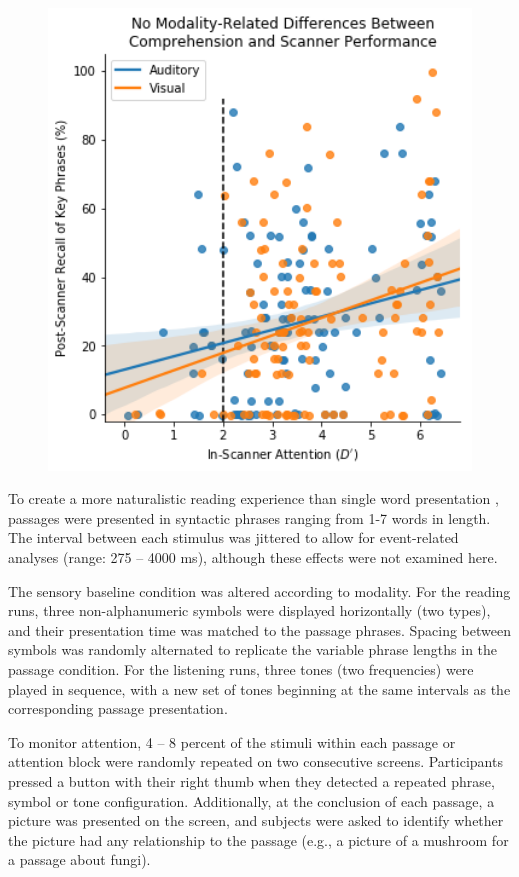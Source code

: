 \begin{figure}[tp]
	\centering
	\includegraphics[width=5in]{images/ch2-eprime-recall.png}
	\caption[Schematic of the reading comprehension task.]
	\label{fig:ch2-task-design}
\end{figure}

To create a more naturalistic reading experience than single word presentation \citep{Rayner1986}, passages were presented in syntactic phrases ranging from 1-7 words in length. The interval between each stimulus was jittered to allow for event-related analyses (range: 275 – 4000 ms), although these effects were not examined here.

The sensory baseline condition was altered according to modality. For the reading runs, three non-alphanumeric symbols were displayed horizontally (two types), and their presentation time was matched to the passage phrases. Spacing between symbols was randomly alternated to replicate the variable phrase lengths in the passage condition. For the listening runs, three tones (two frequencies) were played in sequence, with a new set of tones beginning at the same intervals as the corresponding passage presentation. 

To monitor attention, 4 – 8 percent of the stimuli within each passage or attention block were randomly repeated on two consecutive screens.  Participants pressed a button with their right thumb when they detected a repeated phrase, symbol or tone configuration. Additionally, at the conclusion of each passage, a picture was presented on the screen, and subjects were asked to identify whether the picture had any relationship to the passage (e.g., a picture of a mushroom for a passage about fungi). 

